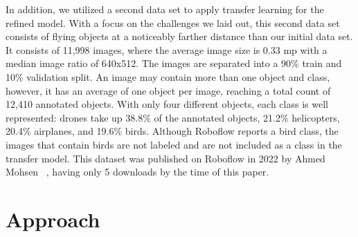 \documentclass[10pt,twocolumn,letterpaper]{article}
\begin{document}
In addition, we utilized a second data set \cite{TransferDataset} to apply transfer learning for the refined model. With a focus on the challenges we laid out, this second data set consists of flying objects at a noticeably farther distance than our initial data set. It consists of 11,998 images, where the average image size is 0.33 mp with a median image ratio of 640x512. The images are separated into a 90\% train and 10\% validation split. An image may contain more than one object and class, however, it has an average of one object per image, reaching a total count of 12,410 annotated objects. With only four different objects, each class is well represented: drones take up 38.8\% of the annotated objects, 21.2\% helicopters, 20.4\% airplanes, and 19.6\% birds. Although Roboflow reports a bird class, the images that contain birds are not labeled and are not included as a class in the transfer model. This dataset was published on Roboflow in 2022 by Ahmed Mohsen ~\cite{TransferDataset}, having only 5 downloads by the time of this paper.

\section{Approach}
\end{document}
